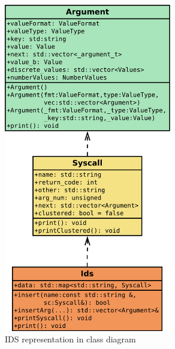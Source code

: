 \begin{figure}[H]
	\centering
	\includegraphics[width=0.65\textwidth]{obrazky-figures/class/arg_sc.pdf}
	\caption{IDS representation in class diagram}
	\label{fig:class:ids}
\end{figure}

